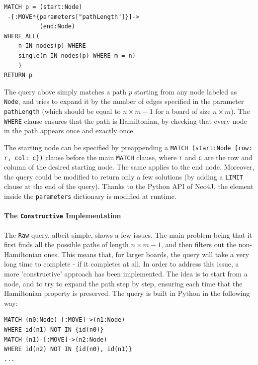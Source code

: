 \documentclass[conference]{IEEEtran}
\begin{document}
\begin{tcolorbox}[colback=yellow!5!white, colframe=yellow!50!black]
\begin{verbatim}
MATCH p = (start:Node)
 -[:MOVE*{parameters["pathLength"]}]->
          (end:Node)
WHERE ALL(
    n IN nodes(p) WHERE 
    single(m IN nodes(p) WHERE m = n)
    )
RETURN p
\end{verbatim}
\end{tcolorbox}

The query above simply matches a path $p$ starting from any node labeled as \texttt{Node}, and tries to expand it by the number of edges specified in the parameter \texttt{pathLength} (which should be equal to $n \times m - 1$ for a board of size $n \times m$).
The \texttt{WHERE} clause ensures that the path is Hamiltonian, by checking that every node in the path appears once and exactly once.

The starting node can be specified by preappending a \texttt{MATCH (start:Node \{row: r, col: c\})} clause before the main \texttt{MATCH} clause, where \texttt{r} and \texttt{c} are the row and column of the desired starting node. The same applies to the end node.
Moreover, the query could be modified to return only a few solutions (by adding a \texttt{LIMIT} clause at the end of the query).
Thanks to the Python API of Neo4J, the element inside the \texttt{parameters} dictionary is modified at runtime.

\paragraph{The \texttt{Constructive} Implementation}
The \texttt{Raw} query, albeit simple, shows a few issues. The main problem being that it first finds all the possible paths of length $n \times m - 1$, and then filters out the non-Hamiltonian ones. This means that, for larger boards, the query will take a very long time to complete - if it completes at all.
In order to address this issue, a more 'constructive' approach has been implemented. The idea is to start from a node, and to try to expand the path step by step, ensuring each time that the Hamiltonian property is preserved.
The query is built in Python in the following way:
\begin{tcolorbox}[colback=yellow!5!white, colframe=yellow!50!black]
\begin{verbatim}
MATCH (n0:Node)-[:MOVE]->(n1:Node)
WHERE id(n1) NOT IN {id(n0)}
MATCH (n1)-[:MOVE]->(n2:Node)
WHERE id(n2) NOT IN {id(n0), id(n1)}
...
\end{verbatim}
\end{tcolorbox}
\end{document}
